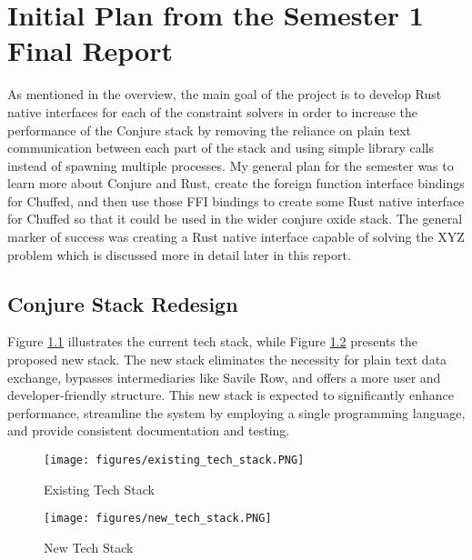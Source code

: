 \chapter{Initial Plan from the Semester 1 Final Report}
\label{appendix:plan-d2-semester1}

As mentioned in the overview, the main goal of the project is to develop Rust
native interfaces for each of the constraint solvers in order to increase the
performance of the Conjure stack by removing the reliance on plain text
communication between each part of the stack and using simple library calls
instead of spawning multiple processes. My general plan for the semester was to
learn more about Conjure and Rust, create the foreign function interface
bindings for Chuffed, and then use those FFI bindings to create some Rust
native interface for Chuffed so that it could be used in the wider conjure
oxide stack. The general marker of success was creating a Rust native interface
capable of solving the XYZ problem which is discussed more in detail later in
this report.


\section{Conjure Stack Redesign}

Figure \ref{fig:existing-tech-stack} illustrates the current tech stack, while Figure \ref{fig:new-tech-stack} presents the
proposed new stack. The new stack eliminates the necessity for plain text data
exchange, bypasses intermediaries like Savile Row, and offers a more user and
developer-friendly structure. This new stack is expected to significantly
enhance performance, streamline the system by employing a single programming
language, and provide consistent documentation and testing.

\begin{figure}
	\centering
	\texttt{[image: figures/existing\_tech\_stack.PNG]}
	\caption{Existing Tech Stack}
	\label{fig:existing-tech-stack}
\end{figure}

\begin{figure}
	\centering
	\texttt{[image: figures/new\_tech\_stack.PNG]}
	\caption{New Tech Stack}
	\label{fig:new-tech-stack}
\end{figure}
